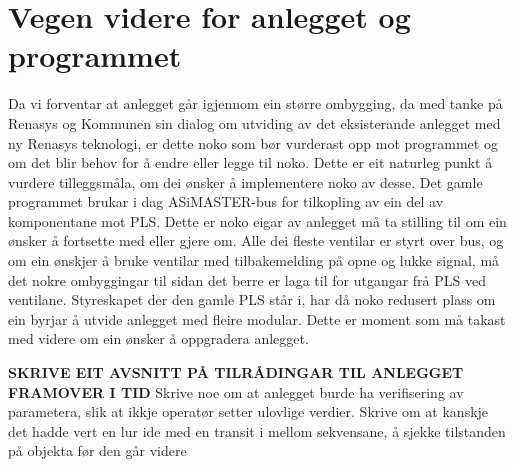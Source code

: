 \section{Vegen videre for anlegget og programmet}
\thispagestyle{fancy}



Da vi forventar at anlegget går igjennom ein større ombygging,  da med tanke på Renasys og Kommunen sin dialog om utviding av det eksisterande anlegget med ny Renasys teknologi, er dette noko som bør vurderast opp mot programmet og om det blir behov for å endre eller legge til noko. 
Dette er eit naturleg punkt å vurdere tilleggsmåla, om dei ønsker å implementere noko av desse.
Det gamle programmet brukar i dag ASiMASTER-bus for tilkopling av ein del av komponentane mot PLS. 
Dette er noko eigar av anlegget må ta stilling til om ein ønsker å fortsette med eller gjere om. Alle dei fleste ventilar er styrt over bus, og om ein ønskjer å bruke ventilar med tilbakemelding på opne og lukke signal, må det nokre ombyggingar til sidan det berre er laga til for utgangar frå PLS ved ventilane.
Styreskapet der den gamle PLS står i, har då noko redusert plass om ein byrjar å utvide anlegget med fleire modular. 
Dette er moment som må takast med videre om ein ønsker å oppgradera anlegget. 

\textbf{SKRIVE EIT AVSNITT PÅ TILRÅDINGAR TIL ANLEGGET FRAMOVER I TID}
        Skrive noe om at anlegget burde ha verifisering av parametera, slik at 
            ikkje operatør setter ulovlige verdier.
        Skrive om at kanskje det hadde vert en lur ide med en transit i mellom sekvensane, å sjekke tilstanden på objekta før den går videre

